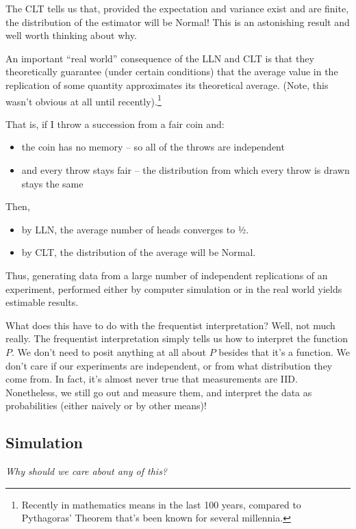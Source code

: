 \documentclass[11pt,a4paper]{article}
\begin{document}
The CLT tells us that, 
provided the expectation and variance exist and are finite, 
the distribution of the estimator will be Normal! 
This is an astonishing result and well worth thinking about why.

An important ``real world'' consequence of the LLN and CLT is that they 
theoretically guarantee (under certain conditions) that the average value in the replication 
of some quantity approximates its theoretical average. 
(Note, this wasn't obvious at all until recently).\footnote{Recently in mathematics means in the last 100 years, 
compared to Pythagoras' Theorem that's been known for several millennia.}

That is, if I throw a succession from a fair coin and:
\begin{itemize}
\item the coin has no memory -- so all of the throws are independent
\item and every throw stays fair -- the distribution from which every throw is 
drawn stays the same
\end{itemize}

Then,
\begin{itemize}
\item by LLN, the average number of heads converges to ½. 
\item by CLT, the distribution of the average will be Normal.
\end{itemize}

Thus, generating data from a large number of independent replications of an experiment, 
performed either by computer simulation or in the real world yields estimable results.

What does this have to do with the frequentist interpretation? 
Well, not much really. 
The frequentist interpretation simply tells us how to interpret the function \(P\). 
We don't need to posit anything at all about \(P\) besides that it's a function. 
We don't care if our experiments are independent, 
or from what distribution they come from.
In fact, 
it's almost never true that measurements are IID. 
Nonetheless, we still go out and measure them, and interpret the data as probabilities (either naively or by other means)!

\subsection{Simulation}

\emph{Why should we care about any of this?}
\end{document}

